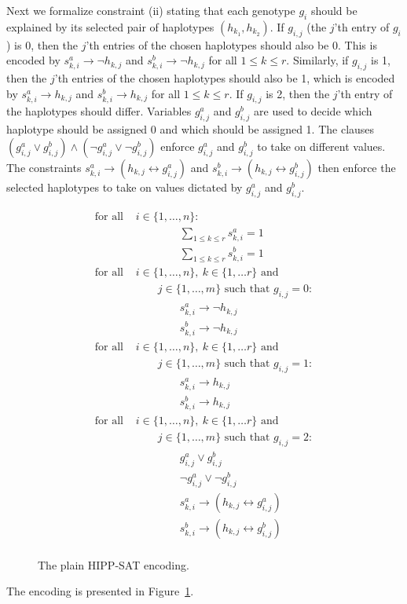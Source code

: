 \documentclass[12pt,a4paper]{article}
\begin{document}
Next we formalize constraint (ii) stating that each genotype $g_i$ should be explained by its selected pair of haplotypes $(h_{k_1}, h_{k_2})$.
If $g_{i,j}$ (the $j$'th entry of $g_i$) is 0, then the $j$'th entries of the chosen haplotypes should also be 0.
This is encoded by $s^a_{k,i}\rightarrow\neg h_{k,j}$ and $s^b_{k,i}\rightarrow\neg h_{k,j}$ for all $1\leq k \leq r$.
Similarly, if $g_{i,j}$ is 1, then the $j$'th entries of the chosen haplotypes should also be 1, which is encoded by $s^a_{k,i}\rightarrow h_{k,j}$ and $s^b_{k,i}\rightarrow h_{k,j}$ for all $1\leq k \leq r$.
If $g_{i,j}$ is 2, then the $j$'th entry of the haplotypes should differ.
Variables $g^a_{i,j}$ and $g^b_{i,j}$ are used to decide which haplotype should be assigned 0 and which should be assigned 1.
The clauses $(g^a_{i,j}\vee g^b_{i,j})\wedge(\neg g^a_{i,j}\vee \neg g^b_{i,j})$ enforce $g^a_{i,j}$ and $g^b_{i,j}$ to take on different values.
The constraints $s^a_{k,i}\rightarrow (h_{k,j}\leftrightarrow g^a_{i,j})$ and $s^b_{k,i}\rightarrow (h_{k,j}\leftrightarrow g^b_{i,j})$ then enforce the selected haplotypes to take on values dictated by $g^a_{i,j}$ and $g^b_{i,j}$.
\begin{figure}
\centering
\small
\begin{align}
\text{for all  }& i\in\{1,\dots , n\}:\nonumber\\
& \quad\quad\quad\quad \sum_{1\leq k \leq r} s^a_{k,i} = 1 \\
& \quad\quad\quad\quad \sum_{1\leq k \leq r} s^b_{k,i} = 1 \\
\text{for all  }& i\in\{1,\dots , n\},\ k\in\{1,\dots r\}\text{ and }\nonumber\\&\quad\quad j\in\{1,\dots ,m\} \text{ such that }g_{i,j}=0:\nonumber\\
& \quad\quad\quad\quad s^a_{k,i}\rightarrow \neg h_{k,j} \\
& \quad\quad\quad\quad s^b_{k,i}\rightarrow \neg h_{k,j} \\
\text{for all  }& i\in\{1,\dots , n\},\ k\in\{1,\dots r\}\text{ and }\nonumber\\&\quad\quad j\in\{1,\dots ,m\} \text{ such that }g_{i,j}=1:\nonumber\\
& \quad\quad\quad\quad s^a_{k,i}\rightarrow h_{k,j} \\
& \quad\quad\quad\quad s^b_{k,i}\rightarrow h_{k,j} \\
\text{for all  }& i\in\{1,\dots , n\},\ k\in\{1,\dots r\}\text{ and }\nonumber\\&\quad\quad j\in\{1,\dots ,m\} \text{ such that }g_{i,j}=2:\nonumber\\
& \quad\quad\quad\quad g^a_{i,j}\vee g^b_{i,j} \\
& \quad\quad\quad\quad \neg g^a_{i,j}\vee \neg g^b_{i,j} \\
& \quad\quad\quad\quad s^a_{k,i}\rightarrow (h_{k,j}\leftrightarrow g^a_{i,j}) \\
& \quad\quad\quad\quad s^b_{k,i}\rightarrow (h_{k,j}\leftrightarrow g^b_{i,j}) \\
\end{align}
\caption{The plain HIPP-SAT encoding.}
\label{fig:enc-hipp-sat}
\end{figure}
The encoding is presented in Figure~\ref{fig:enc-hipp-sat}.
\end{document}
